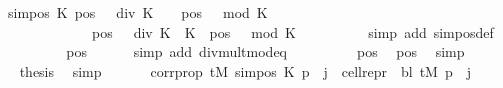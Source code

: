 \begin{isabellebody}
\ {\isachardoublequoteopen}sim{\isacharunderscore}{\kern0pt}pos\ {\isacharquery}{\kern0pt}K\ {\isacharparenleft}{\kern0pt}{\isacharparenleft}{\kern0pt}pos\ {\isacharminus}{\kern0pt}\ {}{\isacharparenright}{\kern0pt}\ div\ {\isacharquery}{\kern0pt}K\ {\isacharplus}{\kern0pt}\ {}{\isacharparenright}{\kern0pt}\ {\isacharplus}{\kern0pt}\ {\isacharparenleft}{\kern0pt}pos\ {\isacharminus}{\kern0pt}\ {}{\isacharparenright}{\kern0pt}\ mod\ {\isacharquery}{\kern0pt}K\isanewline
\ \ \ \ \ \ \ \ \ \ \ \ {\isacharequal}{\kern0pt}\ {\isacharparenleft}{\kern0pt}pos\ {\isacharminus}{\kern0pt}\ {}{\isacharparenright}{\kern0pt}\ div\ {\isacharquery}{\kern0pt}K\ {\isacharasterisk}{\kern0pt}\ {\isacharquery}{\kern0pt}K\ {\isacharplus}{\kern0pt}\ {\isacharparenleft}{\kern0pt}pos\ {\isacharminus}{\kern0pt}\ {}{\isacharparenright}{\kern0pt}\ mod\ {\isacharquery}{\kern0pt}K\ {\isacharplus}{\kern0pt}\ {}{\isachardoublequoteclose}\isanewline
\ \ \ \ \ \ \isamarkupfalse%
\ {\isacharparenleft}{\kern0pt}simp\ add{\isacharcolon}{\kern0pt}\ sim{\isacharunderscore}{\kern0pt}pos{\isacharunderscore}{\kern0pt}def{\isacharparenright}{\kern0pt}\isanewline
\ \ \ \ \isamarkupfalse%
\ \isamarkupfalse%
\ {\isachardoublequoteopen}{\isasymdots}\ {\isacharequal}{\kern0pt}\ {\isacharparenleft}{\kern0pt}pos\ {\isacharminus}{\kern0pt}\ {}{\isacharparenright}{\kern0pt}\ {\isacharplus}{\kern0pt}\ {}{\isachardoublequoteclose}\ \isamarkupfalse%
\ {\isacharparenleft}{\kern0pt}simp\ add{\isacharcolon}{\kern0pt}\ div{\isacharunderscore}{\kern0pt}mult{\isacharunderscore}{\kern0pt}mod{\isacharunderscore}{\kern0pt}eq{\isacharparenright}{\kern0pt}\isanewline
\ \ \ \ \isamarkupfalse%
\ \isamarkupfalse%
\ {\isachardoublequoteopen}{\isasymdots}\ {\isacharequal}{\kern0pt}\ pos{\isachardoublequoteclose}\ \isamarkupfalse%
\ pos{}\ \isamarkupfalse%
\ simp\isanewline
\ \ \ \ \isamarkupfalse%
\ \isamarkupfalse%
\ {\isacharquery}{\kern0pt}thesis\ \isamarkupfalse%
\ simp\isanewline
\ \ \isamarkupfalse%
\isanewline
\ \ \isamarkupfalse%
\ corrprop{\isacharcolon}{\kern0pt}\ {\isachardoublequoteopen}tM{\isacharprime}{\kern0pt}\ {\isacharparenleft}{\kern0pt}sim{\isacharunderscore}{\kern0pt}pos\ {\isacharquery}{\kern0pt}K\ p\ {\isacharplus}{\kern0pt}\ j{\isacharparenright}{\kern0pt}\ {\isacharequal}{\kern0pt}\ cell{\isacharunderscore}{\kern0pt}repr\ {\isasymGamma}\ bl\ {\isacharparenleft}{\kern0pt}tM\ p{\isacharparenright}{\kern0pt}\ {\isacharbang}{\kern0pt}\ j{\isachardoublequoteclose}\isanewline

\end{isabellebody}
